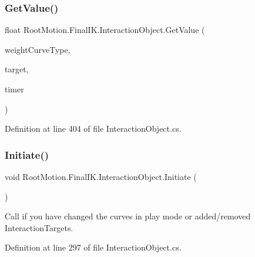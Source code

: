 \subsubsection{\texorpdfstring{Get\+Value()}{GetValue()}}
{\footnotesize\ttfamily float Root\+Motion.\+Final\+I\+K.\+Interaction\+Object.\+Get\+Value (\begin{DoxyParamCaption}\item[{\mbox{\hyperlink{class_root_motion_1_1_final_i_k_1_1_interaction_object_1_1_weight_curve_a74c8be2e80ace86b130c88e275300b27}{Weight\+Curve.\+Type}}}]{weight\+Curve\+Type,  }\item[{\mbox{\hyperlink{class_root_motion_1_1_final_i_k_1_1_interaction_target}{Interaction\+Target}}}]{target,  }\item[{float}]{timer }\end{DoxyParamCaption})}



Definition at line 404 of file Interaction\+Object.\+cs.

\mbox{\label{class_root_motion_1_1_final_i_k_1_1_interaction_object_ae8d77c984a0f9257d83636d05067ad14}} 
\subsubsection{\texorpdfstring{Initiate()}{Initiate()}}
{\footnotesize\ttfamily void Root\+Motion.\+Final\+I\+K.\+Interaction\+Object.\+Initiate (\begin{DoxyParamCaption}{ }\end{DoxyParamCaption})}



Call if you have changed the curves in play mode or added/removed Interaction\+Targets. 



Definition at line 297 of file Interaction\+Object.\+cs.

\mbox{\label{class_root_motion_1_1_final_i_k_1_1_interaction_object_accd0d6d527e3961d08d1145bcd966429}} 
